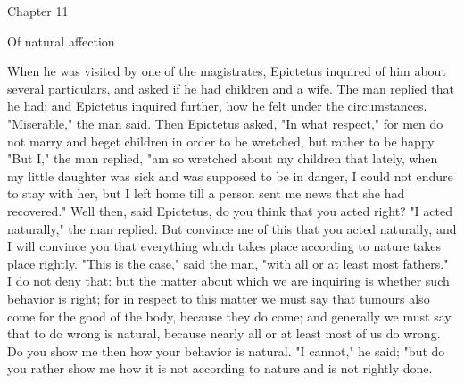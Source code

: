 \documentclass[a4paper]{article}
\begin{document}
Chapter 11

Of natural affection 

When he was visited by one of the magistrates, Epictetus inquired
of him about several particulars, and asked if he had children and
a wife. The man replied that he had; and Epictetus inquired further,
how he felt under the circumstances. "Miserable," the man said. Then
Epictetus asked, "In what respect," for men do not marry and beget
children in order to be wretched, but rather to be happy. "But I,"
the man replied, "am so wretched about my children that lately, when
my little daughter was sick and was supposed to be in danger, I could
not endure to stay with her, but I left home till a person sent me
news that she had recovered." Well then, said Epictetus, do you think
that you acted right? "I acted naturally," the man replied. But convince
me of this that you acted naturally, and I will convince you that
everything which takes place according to nature takes place rightly.
"This is the case," said the man, "with all or at least most fathers."
I do not deny that: but the matter about which we are inquiring is
whether such behavior is right; for in respect to this matter we must
say that tumours also come for the good of the body, because they
do come; and generally we must say that to do wrong is natural, because
nearly all or at least most of us do wrong. Do you show me then how
your behavior is natural. "I cannot," he said; "but do you rather
show me how it is not according to nature and is not rightly done.
\end{document}
